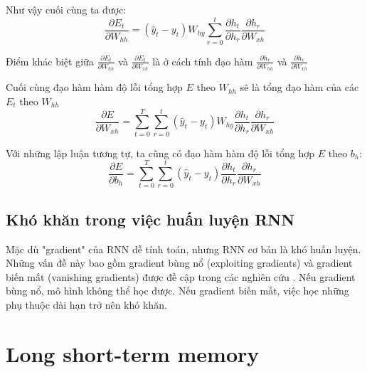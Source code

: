 Như vậy cuối cùng ta được:
\begin{equation} \label{gradientWRTSt18}
	\frac{\partial{E_t}}{\partial{W_{hh}}} = (\hat{y}_t - y_t) W_{hy} \sum_{r=0}^{t} \frac{\partial{h_t}}{\partial{h_r}} \frac{\partial{h_r}}{\partial{W_{xh}}}
\end{equation}

Điểm khác biệt giữa $\frac{\partial{E_t}}{\partial{W_{hh}}}$ và $\frac{\partial{E_t}}{\partial{W_{xh}}}$ là ở cách tính đạo hàm $\frac{\partial{h_r}}{\partial{W_{hh}}}$ và $\frac{\partial{h_r}}{\partial{W_{xh}}}$

Cuối cùng đạo hàm hàm độ lỗi tổng hợp $E$ theo $W_{hh}$ sẽ là tổng đạo hàm của các $E_t$ theo $W_{hh}$
\begin{equation} \label{gradientWRTSt19}
	\frac{\partial{E}}{\partial{W_{xh}}} = \sum_{t=0}^{T} \sum_{r=0}^{t} (\hat{y}_t - y_t) W_{hy}\frac{\partial{h_t}}{\partial{h_r}} \frac{\partial{h_r}}{\partial{W_{xh}}}
\end{equation}

Với những lập luận tương tự, ta cũng có đạo hàm hàm độ lỗi tổng hợp $E$ theo $b_h$:
\begin{equation} \label{gradientWRTSt20}
	\frac{\partial{E}}{\partial{b_h}} = \sum_{t=0}^{T} \sum_{r=0}^{t} (\hat{y}_t - y_t) \frac{\partial{h_t}}{\partial{h_r}} \frac{\partial{h_r}}{\partial{W_{xh}}}
\end{equation}

\subsection{Khó khăn trong việc huấn luyện RNN}

Mặc dù "gradient" của RNN dễ tính toán, nhưng RNN cơ bản là khó huấn luyện. Những vấn đề này bao gồm gradient bùng nổ (exploiting gradients) và gradient biến mất (vanishing gradients) được đề cập trong các nghiên cứu \cite{pascanu2011} \cite{hochreiter1997}. Nếu gradient bùng nổ, mô hình không thể học được. Nếu gradient biến mất, việc học những phụ thuộc dài hạn trở nên khó khăn.

\section{Long short-term memory}

